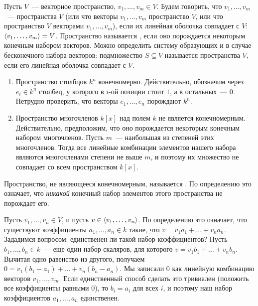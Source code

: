 \begin{definition}\label{dfn:spanning-set}
Пусть $V$~--- векторное пространство, $v_1,\dots,v_m\in V$.
Будем говорить, что $v_1,\dots,v_m$~--- 
пространства $V$ (или что векторы $v_1,\dots,v_m$ 
пространство $V$, или что пространство $V$ 
векторами $v_1,\dots,v_m$), если их линейная оболочка совпадает с $V$:
$\langle v_1,\dots,v_m\rangle = V$.
Пространство называется , если
оно порождается некоторым конечным набором векторов.
Можно определить систему образующих и в случае бесконечного набора
векторов: подмножество $S\subseteq V$ называется 
пространства $V$, если его линейная оболочка совпадает с $V$.
\end{definition}
\begin{examples}
\begin{enumerate}
\item Пространство столбцов $k^n$ конечномерно. Действительно, обозначим
через $e_i\in k^n$ столбец, у которого в $i$-ой позиции стоит $1$, а
в остальных~--- $0$. Нетрудно проверить, что векторы
$e_1,\dots,e_n$ порождают $k^n$.
\item Пространство многочленов $k[x]$ над полем $k$ не является конечномерным.
Действительно, предположим, что оно порождается некоторым конечным набором
многочленов. Пусть $m$~--- наибольшая из степеней этих многочленов.
Тогда все линейные комбинации элементов нашего набора являются многочленами
степени не выше $m$, и поэтому их множество не совпадает со всем
пространством $k[x]$.
\end{enumerate}
\end{examples}

\begin{definition}
Пространство, не являющееся конечномерным, называется
. По определению это означает, что
{\em никакой} конечный набор элементов этого пространства не порождает его.
\end{definition}

Пусть $v_1,\dots,v_n\in V$, и пусть $v\in\langle v_1,\dots,v_n\rangle$. По определению
это означает, что существуют коэффициенты $a_1,\dots,a_n\in k$ такие,
что $v = v_1a_1 + \dots + v_na_n$.
Зададимся вопросом: единственен ли такой набор коэффициентов?
Пусть $b_1,\dots,b_n\in k$~--- еще один набор скаляров, для которого
$v = v_1b_1 + \dots + v_nb_n$.
Вычитая одно равенство из другого, получаем
$0 = v_1(b_1 - a_1) + \dots + v_n(b_n - a_n)$.
Мы записали $0$ как линейную комбинацию векторов $v_1,\dots,v_m$.
Если единственный способ сделать это тривиален (положить все коэффициенты
равными $0$), то $b_i = a_i$ для всех $i$, и поэтому наш набор коэффициентов
$a_1,\dots,a_n$ единственен.

